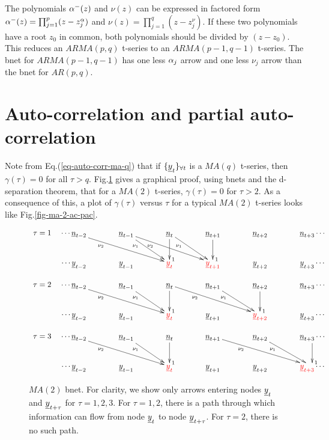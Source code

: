 The polynomials $\alpha^-(z)$
and $\nu(z)$ can be expressed
in factored form $\alpha^-(z)=
\prod_{j=1}^{p}(z-z^\alpha_j)$
and
$\nu(z)=
\prod_{j=1}^{q}(z-z^\nu_j)$.
If these two polynomials have
a root $z_0$ in common,
both polynomials should
be divided by $(z-z_0)$.
This reduces an $ARMA(p,q)$
t-series to an $ARMA(p-1, q-1)$
t-series.
The bnet for
$ARMA(p-1, q-1)$
has one less $\alpha_j$ arrow
and one less $\nu_j$ arrow
than the bnet
for $AR(p,q)$.



\section{Auto-correlation
and partial auto-correlation}

Note
from Eq.(\ref{eq-auto-corr-ma-q})
 that if
$\tseries{\rvy_t}$
is a $MA(q)$ t-series, then
$\gamma(\tau)=0$  for all $\tau>q$.
Fig.\ref{fig-ma-2-tau-123}
gives a graphical proof,
using
bnets and the
d-separation
theorem,
that
for a $MA(2)$
t-series, $\gamma(\tau)=0$
for $\tau>2$.
As a consequence of this,
a plot of $\gamma(\tau)$
versus $\tau$
for a typical $MA(2)$
t-series looks like Fig.\ref{fig-ma-2-ac-pac}.



\begin{figure}[h!]
$$
\begin{array}{ll}
\tau=1&
\xymatrix@C=36px{
\cdots
\rvn_{t-2}\ar[drr]_(.3){\nu_2}
&\rvn_{t-1}\ar[dr]_(.3){\nu_1}
\ar[drr]_(.3){\nu_2}
&\rvn_t\ar[d]^>1
\ar[dr]_(.3){\nu_1}
&\rvn_{t+1}\ar[d]^>1
&\rvn_{t+2}
&\rvn_{t+3}
\cdots
\\
\cdots
\rvy_{t-2}
&\rvy_{t-1}
&{\color{red}\rvy_t}
&{\color{red}\rvy_{t+1}}
&\rvy_{t+2}
&\rvy_{t+3}
\cdots
}
\\
\\
\tau=2&
\xymatrix@C=36px{
\cdots
\rvn_{t-2}\ar[drr]_(.3){\nu_2}
&\rvn_{t-1}\ar[dr]_(.3){\nu_1}
&\rvn_t\ar[drr]_(.3){\nu_2}
\ar[d]^>1
&\rvn_{t+1}\ar[dr]_(.3){\nu_1}
&\rvn_{t+2}\ar[d]^>1
&\rvn_{t+3}
\cdots
\\
\cdots
\rvy_{t-2}
&\rvy_{t-1}
&{\color{red}\rvy_t}
&{\rvy_{t+1}}
&{\color{red}\rvy_{t+2}}
&\rvy_{t+3}
\cdots
}
\\
\\
\tau=3&
\xymatrix@C=36px{
\cdots
\rvn_{t-2}\ar[drr]_(.3){\nu_2}
&\rvn_{t-1}\ar[dr]_(.3){\nu_1}
&\rvn_t\ar[d]^>1
&\rvn_{t+1}\ar[drr]_(.3){\nu_2}
&\rvn_{t+2}\ar[dr]_(.3){\nu_1}
&\rvn_{t+3}\ar[d]^>1
\cdots
\\
\cdots
\rvy_{t-2}
&\rvy_{t-1}
&{\color{red}\rvy_t}
&{\rvy_{t+1}}
&{\rvy_{t+2}}
&{\color{red}\rvy_{t+3}}
\cdots
}
\end{array}
$$
\caption{$MA(2)$ bnet.
For clarity, we show only arrows
entering nodes
$\rvy_t$ and $\rvy_{t+\tau}$
for $\tau=1,2,3$.
For $\tau=1,2$, there is a path
through which
information can flow
from node $\rvy_t$
to node $\rvy_{t+\tau}$.
For $\tau=2$, there is no such path.
}
\label{fig-ma-2-tau-123}
\end{figure}

